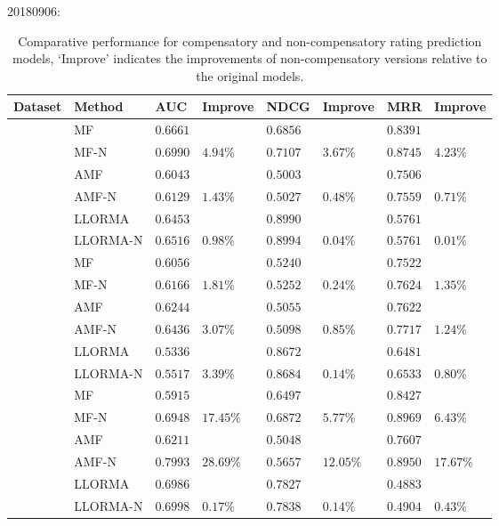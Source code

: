 \documentclass[letterpaper]{article} %
\begin{document}
20180906:
\begin{table}[htp]
\tiny
\caption{Comparative performance for compensatory and non-compensatory rating prediction models, `Improve' indicates the improvements of non-compensatory versions relative to the original models.}
\begin{center}
\begin{tabular}{p{0.4cm}<{\centering}|p{1.2cm}<{\centering} |p{0.5cm} p{0.6cm} |p{0.5cm} p{0.6cm} |p{0.5cm} p{0.6cm}}
\hline
Dataset	& Method	& AUC	& Improve&	NDCG&	Improve&	MRR	&Improve\\\hline
{} &	MF	& $0.6661$ 	& &	$0.6856$ 	&&	$0.8391$ 	&\\
	&MF-N	&$0.6990$ &	$4.94\%$	&$0.7107 $	&$3.67\%$	&$0.8745$ &	$4.23\%$	\\
	&AMF&	$0.6043$ 	&&	$0.5003$ 	&&	$0.7506$ &\\
	&AMF-N	&$0.6129$ 	&$1.43\%$	&$0.5027$ &	$0.48\%$	&$0.7559$ 	&$0.71\%$	\\
	&LLORMA		&$0.6453$&	&$0.8990$ 	&&	$0.5761$&\\	
	&LLORMA-N	&$0.6516$	&$0.98\%$	&	$0.8994$ 	&$0.04\%$	&$0.5761$ 	&$0.01\%$	\\
	\hline
{}	&MF	&$0.6056 $	&&	$0.5240$&&		$0.7522 $	&	\\
	&MF-N&	$0.6166$ 	&$1.81\%$	&$0.5252$ 	&$0.24\%$	&$0.7624$ 	&$1.35\%$\\
	&AMF	&$0.6244 $	&&	$0.5055 $&&		$0.7622 $	&	\\
	&AMF-N	&$0.6436$ 	&$3.07\%$	&$0.5098$ 	&$0.85\%$	&$0.7717$ 	&$1.24\%$	\\
	&LLORMA	&$0.5336$& &		$0.8672$ 	&&	$0.6481$ 	&	\\
	&LLORMA-N		&$0.5517$	&$3.39\%$ &	$0.8684$ &	$0.14\%$	&$0.6533$ 	&$0.80\%$	\\
	\hline
{}	&MF	&$0.5915$ 	&&	$0.6497$&	&	$0.8427$ &	\\
	&MF-N	&$0.6948$ 	&$17.45\%$	&$0.6872$ 	&$5.77\%$	&$0.8969 $	&$6.43\%$	\\
	&AMF	&$0.6211$ 	&&	$0.5048$ 	&&	$0.7607$ 	&	\\
	&AMF-N	&$0.7993 $&	$28.69\%$	&$0.5657$ 	&$12.05\%$	&$0.8950$ 	&$17.67\%$	\\
	&LLORMA		&$0.6986$&	&$0.7827 $		&&$0.4883$ 		& 	\\
	&LLORMA-N	&$0.6998$	&$0.17\%$&	$0.7838$ 	&$0.14\%$	&$0.4904 $	&$0.43\%$	\\
	\hline
	\end{tabular}
\end{center}
\label{tab:ratingresult}
\end{table}%
\end{document}
